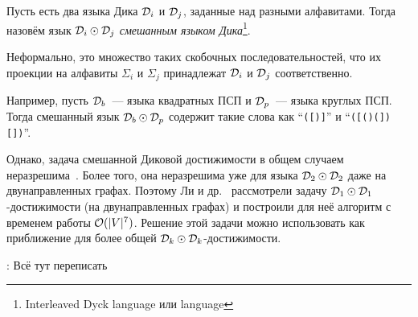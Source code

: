 \begin{definition}
  Пусть есть два языка Дика $\mathcal{D}_i$ и $\mathcal{D}_j$, заданные над разными алфавитами. Тогда назовём язык $\mathcal{D}_i \odot \mathcal{D}_j$ \textit{смешанным языком Дика}\footnote{Interleaved Dyck language или  language}.

  Неформально, это множество таких скобочных последовательностей, что их проекции на алфавиты $\Sigma_i$ и $\Sigma_j$ принадлежат $\mathcal{D}_i$ и $\mathcal{D}_j$ соответственно.

  Например, пусть $\mathcal{D}_b$~--- языка квадратных ПСП и $\mathcal{D}_p$~--- языка круглых ПСП. Тогда смешанный язык $\mathcal{D}_b \odot \mathcal{D}_p$ содержит такие слова как ``\texttt{([)]}'' и ``\texttt{([()(])[])}''.
\end{definition}

Однако, задача смешанной Диковой достижимости в общем случаем неразрешима~\cite{Reps00}. Более того, она неразрешима уже для языка $\mathcal{D}_2 \odot \mathcal{D}_2$ даже на двунаправленных графах. Поэтому Ли и др.~\cite{Li21} рассмотрели задачу $\mathcal{D}_1 \odot \mathcal{D}_1$-достижимости (на двунаправленных графах) и построили для неё алгоритм с временем работы $\mathcal{O}(|V|^7)$. Решение этой задачи можно использовать как приближение для более общей $\mathcal{D}_k \odot \mathcal{D}_k$-достижимости.

\TODO: Всё тут переписать

